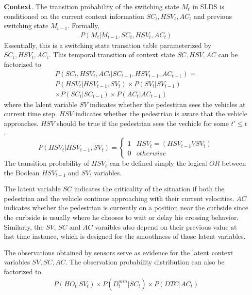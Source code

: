 \documentclass[10pt,twocolumn,letterpaper]{article}
\begin{document}
    \noindent
    \textbf{Context}. The transition probability of the switching state $M_t$ in SLDS is 
    conditioned on the current context information $SC_t, HSV_t, AC_t$ and 
    previous switching state $M_{t-1}$. Formally, 
    \begin{eqnarray*}
        P(M_t|M_{t-1}, SC_t, HSV_t, AC_t)
    \end{eqnarray*}
    Essentially, this is a switching state transition table parameterized by $SC_t, HSV_t, AC_t$.
    This temporal transition of context state $SC, HSV, AC$ can be factorized to
    \begin{eqnarray*}
        P(SC_t, HSV_t, AC_t|SC_{t-1}, HSV_{t-1}, AC_{t-1}) = \\
        P(HSV_t|HSV_{t-1},SV_t)\times P(SV_t|SV_{t-1}) \\
         \times P(SC_t|SC_{t-1}) \times P(AC_t|AC_{t-1})
    \end{eqnarray*}
    where the lalent variable $SV$ indicates whether the pedestiran sees the vehicles at
    current time step. $HSV$ indicates whether the pedestrian is aware that the vehicle approaches.
    $HSV$ should be true if the pedestrian sees the vechicle for some $t'\leq t$. 
    \begin{equation*}
        P(HSV_t|HSV_{t-1}, SV_t) = 
        \left\{
            \begin{array}{lr}  
                1 & HSV_t = (HSV_{t-1} V SV_t)\\  
                0 & otherwise
                \end{array}
        \right.
    \end{equation*}
    The transition probability of $HSV_t$ can be defined simply the logical $OR$ between 
    the Boolean $HSV_{t-1}$ and $SV_t$ variables.

    The latent variable $SC$ indicates the criticality of the situation if both the pedestrian 
    and the vehicle continue approaching with their current velocities. $AC$ indicates whether
    the pedestrian is currently on a position near the curbside since the curbside is usually 
    where he chooses to wait or delay his crossing behavior. Similarly, the $SV$, $SC$ and $AC$
    varaibles also depend on their previous value at last time instance, which is designed for 
    the smoothness of those latent variables.  

    The observations obtained by sensors serve as evidence for the latent context variables 
    $SV, SC, AC$. The observation probability distribution can also be factorized to
    \begin{eqnarray*}
        P(HO_t|SV_t)\times P(D_t^{min}|SC_t) \times P(DTC|AC_t)
    \end{eqnarray*}
\end{document}
